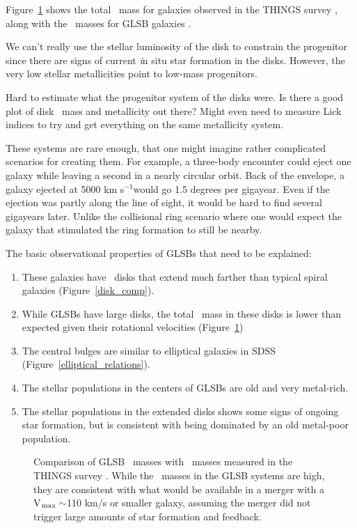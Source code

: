 \documentclass[12pt,preprint]{aastex}
\newcommand\kms{km s$^{-1}$}
\newcommand\HI{\ion{H}{1}}
\begin{document}
Figure~\ref{thingsMHI} shows the total \HI\ mass for galaxies observed in the THINGS survey \citep{Walter2008}, along with the \HI\ masses for GLSB galaxies \citep{Pickering97}.  

We can't really use the stellar luminosity of the disk to constrain the progenitor since there are signs of current {\emph in situ} star formation in the disks.  However, the very low stellar metallicities point to low-mass progenitors.  

Hard to estimate what the progenitor system of the disks were.  Is there a good plot of disk \HI\ mass and metallicity out there?  Might even need to measure Lick indices to try and get everything on the same metallicity system.

These systems are rare enough, that one might imagine rather complicated scenarios for creating them.  For example, a three-body encounter could eject one galaxy while leaving a second in a nearly circular orbit.  Back of the envelope, a galaxy ejected at 5000 \kms would go 1.5 degrees per gigayear.  Even if the ejection was partly along the line of sight, it would be hard to find several gigayears later.  Unlike the collisional ring scenario where one would expect the galaxy that stimulated the ring formation to still be nearby.


The basic observational properties of GLSBs that need to be explained:
\begin{enumerate}
\item{These galaxies have \HI\ disks that extend much farther than typical spiral galaxies (Figure~\ref{disk_comp}). }
\item{While GLSBs have large disks, the total \HI\ mass in these disks is lower than expected given their rotational velocities (Figure~\ref{thingsMHI})}
\item{The central bulges are similar to elliptical galaxies in SDSS (Figure~\ref{elliptical_relations}).}
\item{The stellar populations in the centers of GLSBs are old and very metal-rich.}
\item{The stellar populations in the extended disks shows some signs of ongoing star formation, but is consistent with being dominated by an old metal-poor population.}
\end{enumerate}

\begin{figure}
\caption{Comparison of GLSB \HI\ masses \citep{Pickering97} with \HI\ masses measured in the THINGS survey \citep{Walter2008}.  While the \HI\ masses in the GLSB systems are high, they are consistent with what would be available in a merger with a V$_{\rm{max}}\sim$110 km/s or smaller galaxy, assuming the merger did not trigger large amounts of star formation and feedback. \label{thingsMHI}}
\end{figure}
\end{document}

